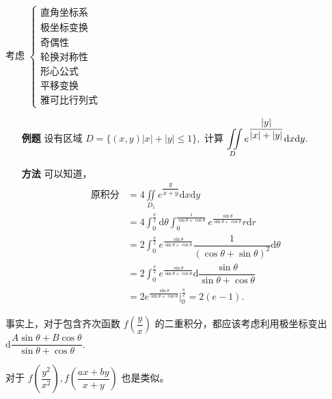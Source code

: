 考虑
$ \begin{cases}
    \textrm{直角坐标系}\\
    \textrm{极坐标变换}\\
    \textrm{奇偶性}\\
    \textrm{轮换对称性}\\
    \textrm{形心公式}\\
    \textrm{平移变换}\\
    \textrm{雅可比行列式}
\end{cases} $ 


\begin{enumerate}
    \item[\textbf{例题}] 设有区域 $ D = \{(x,y)|x|+|y|\leq 1\}, $ 
    计算 $ \displaystyle \iint\limits_D e^{\dfrac{|y|}{|x|+|y|}}\mathrm{d}x\mathrm{d}y. $ 
    \item[\textrm{\textbf{方法}}] 可以知道，
    \begin{equation*}
        \begin{aligned}
            \textrm{原积分} &= 4\iint\limits_{D_1}e^{\dfrac{y}{x+y}}\mathrm{d}x\mathrm{d}y \\ 
            &= 4\int_0^{\frac{\pi}{2}}\mathrm{d}\theta\int_0^{\frac{1}{\sin \theta + \cos \theta}}
            e^{\frac{\sin \theta}{\sin \theta + \cos \theta}}r\mathrm{d}r
            \\&= 2\int_0^{\frac{\pi}{2}} e^{\frac{\sin \theta}{\sin \theta + \cos \theta}} 
            \dfrac{1}{(\cos \theta + \sin \theta)^2}\mathrm{d}\theta
            \\&= 2\int_0^{\frac{\pi}{2}} e^{\frac{\sin \theta}{\sin \theta + \cos \theta}} 
            \mathrm{d}\dfrac{\sin \theta}{\sin \theta + \cos \theta}
            \\&= 2e^{\frac{\sin \theta}{\sin \theta + \cos \theta}}
            \Big|_0^\frac{\pi}{2} = 2(e-1).
        \end{aligned}
    \end{equation*}
\end{enumerate}

事实上，对于包含齐次函数 $ f(\dfrac{y}{x}) $ 的二重积分，都应该考虑利用极坐标变出 
$ \mathrm{d}\dfrac{A\sin\theta+B\cos\theta}{\sin\theta+\cos\theta}. $

对于 $ f(\dfrac{y^2}{x^2}),f(\dfrac{ax+by}{x+y}) $ 也是类似。


